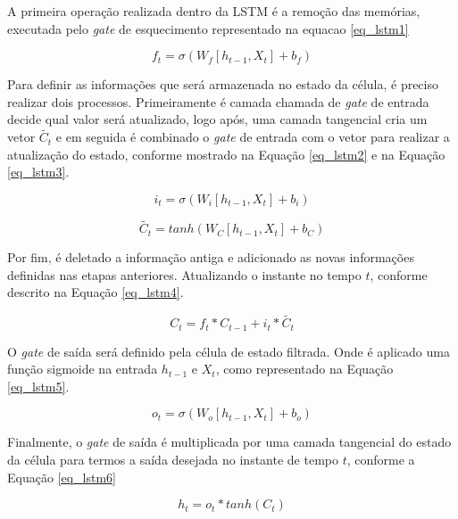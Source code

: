 A primeira operação realizada dentro da LSTM é a remoção das memórias, executada pelo \emph{gate} de esquecimento representado na equacao \ref{eq_lstm1}

\begin{equation}
\label{eq_lstm1}
	f_t = \sigma (W_f [h_{t-1}, X_t]+b_f)
\end{equation}

Para definir as informações que será armazenada no estado da célula, é preciso realizar dois processos. Primeiramente é camada chamada de \emph{gate} de entrada decide qual valor será atualizado, logo após, uma camada tangencial cria um vetor {$\widetilde{C_t}$} e em seguida é combinado o \emph{gate} de entrada com o vetor para realizar a atualização do estado, conforme mostrado na Equação \ref{eq_lstm2} e na Equação \ref{eq_lstm3}. 

\begin{equation}
\label{eq_lstm2}
	i_t = \sigma (W_i [h_{t-1}, X_t]+b_i)
\end{equation}

\begin{equation}
\label{eq_lstm3}
    \widetilde{C_t}=  tanh(W_C [h_{t-1}, X_t]+b_C)
\end{equation}

Por fim, é deletado a informação antiga e adicionado as novas informações definidas nas etapas anteriores. Atualizando o instante no tempo {$t$}, conforme descrito na Equação \ref{eq_lstm4}.

\begin{equation}
\label{eq_lstm4}
    C_t =  f_t * C_{t-1} + i_t * \widetilde{C_t}
\end{equation}

O \emph{gate} de saída será definido pela célula de estado filtrada. Onde é aplicado uma função sigmoide na entrada {$h_{t-1}$} e {$X_t$}, como representado na Equação \ref{eq_lstm5}.

\begin{equation}
\label{eq_lstm5}
    o_t = \sigma(W_o [h_{t-1}, X_t] + b_o)
\end{equation}

Finalmente, o \emph{gate} de saída é multiplicada por uma camada tangencial do estado da célula para termos a saída desejada no instante de tempo {$t$}, conforme a Equação \ref{eq_lstm6}

\begin{equation}
\label{eq_lstm6}
    h_t = o_t * tanh(C_t)
\end{equation}

